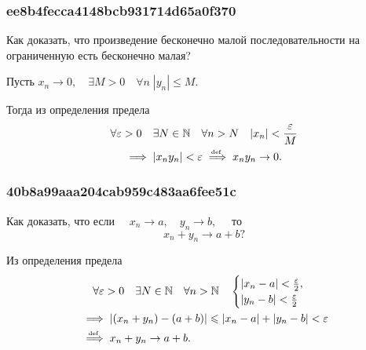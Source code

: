 \documentclass[11pt, a5paper]{article}
\newenvironment{note}[1]{\goodbreak\par\subsubsection{\hfill \color{lightgray}\tiny #1}}{}
\newenvironment{cloze}[2][\ldots]{\begin{leftbar}}{\end{leftbar}}
\begin{document}
    \begin{note}{ee8b4fecca4148bcb931714d65a0f370}
        Как доказать, что произведение бесконечно малой последовательности на
        ограниченную есть бесконечно малая?

        \begin{cloze}{1}
            Пусть \( x_n \to 0, \quad \exists M > 0 \quad \forall n\; |y_n| \leqslant M. \)

            Тогда из определения предела \begin{multline*}
                \forall \varepsilon > 0 \quad \exists N \in \mathbb N \quad
                \forall n > N \quad |x_n| < \frac{\varepsilon}{M} \\
                \implies |x_n y_n| < \varepsilon \overset{\!\!\text{\tiny def}}\implies  x_n y_n \to 0.
            \end{multline*}
        \end{cloze}
    \end{note}

    \begin{note}{40b8a99aaa204cab959c483aa6fee51c}
        Как доказать, что если \( \quad x_n \to a, \quad y_n \to b, \quad \) то \[
            x_n + y_n \to a + b?
        \]

        \begin{cloze}{1}
            Из определения предела \[
                \begin{gathered}
                    \forall \varepsilon > 0 \quad \exists N \in \mathbb N \quad \forall n > \mathbb N \quad \begin{cases}
                        |x_n - a| < \frac{\varepsilon}{2}, \\
                        |y_n - b| < \frac{\varepsilon}{2}
                    \end{cases} \\
                    \begin{aligned}
                        &\implies |(x_n + y_n) - (a + b)| \leqslant |x_n - a| + |y_n - b| < \varepsilon \\
                        &\overset{\!\!\text{\tiny def}}\implies x_n + y_n \to a + b.
                    \end{aligned}
                \end{gathered}
            \]
        \end{cloze}
    \end{note}
\end{document}
